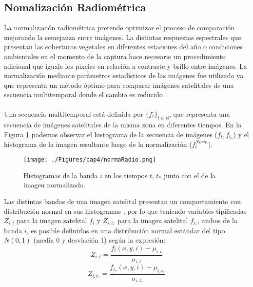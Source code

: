 \subsection{Nomalizaci\'on Radiom\'etrica}\label{sec:capNormalizacion}
La normalizaci\'on radiom\'etrica pretende optimizar el proceso de comparaci\'on mejorando la semejanza entre im\'agenes. La distintas respuestas espectrales que presentan las coberturas vegetales en diferentes estaciones del a\~{n}o o condiciones ambientales en el momento de la captura hace necesario un procedimiento adicional que iguale los pixeles en relaci\'on a contraste y brillo entre im\'agenes. La normalizaci\'on mediante par\'ametros estad\'isticos de las im\'agenes fue utilizado ya que representa un m\'etodo \'optimo para comparar im\'agenes satelitales de una secuencia multitemporal donde el cambio es reducido \cite{mateu1999comparacion}. \\~\\
Una secuencia multitemporal est\'a definida por $ \{f_{t}\}_{t \in \mathbb{N}} $, que representa una secuencia de im\'agenes satelitales de la misma zona en diferentes tiempos. En la Figura \ref{fig:normRadio} podemos observar el histograma de la secuencia de im\'agenes ($ f_{t},f_{t_{*}} $) y el histograma de la imagen resultante luego de la normalizaci\'on ($ f_{t}^{Norm} $).
\begin{figure}[H]
	\centering
	\texttt{[image: ./Figures/cap4/normaRadio.png]}
	\caption{Histogramas de la banda $ i $ en los tiempos $ t $, $ t_* $ junto con el de la imagen normalizada.}
	\label{fig:normRadio}
\end{figure}
Las distintas bandas de una imagen satelital presentan un comportamiento con distribuci\'on normal en sus histogramas \cite{martinez2013normalizacion}, por lo que teniendo variables tipificadas $Z_{i,t}$ para la imagen satelital $ f_{t} $ y $Z_{i,t_{*}}$ para la imagen satelital $ f_{t_{*}}$, ambos de la banda $ i $, es posible definirlos en una distribuci\'on normal est\'andar del tipo $ N(0,1) $ (media $ 0 $ y desviaci\'on $ 1 $) seg\'un la expresi\'on:
\begin{equation}\label{ec:zt}
Z_{i,t}=\dfrac{f_{t}(x,y,i)-\mu_{i,t}}{\sigma_{i,t}}
\end{equation}
\begin{equation}\label{ec:zt2}
Z_{i,t_{*}}=\dfrac{f_{t_{*}}(x,y,i)-\mu_{i,t_{*}}}{\sigma_{i,t_{*}}}
\end{equation}
